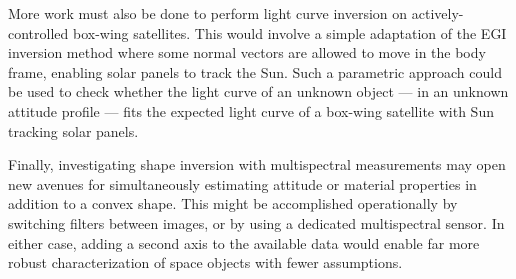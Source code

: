 More work must also be done to perform light curve inversion on actively-controlled box-wing satellites. This would involve a simple adaptation of the EGI inversion method where some normal vectors are allowed to move in the body frame, enabling solar panels to track the Sun. Such a parametric approach could be used to check whether the light curve of an unknown object --- in an unknown attitude profile --- fits the expected light curve of a box-wing satellite with Sun tracking solar panels. 

Finally, investigating shape inversion with multispectral measurements may open new avenues for simultaneously estimating attitude or material properties in addition to a convex shape. This might be accomplished operationally by switching filters between images, or by using a dedicated multispectral sensor. In either case, adding a second axis to the available data would enable far more robust characterization of space objects with fewer assumptions.